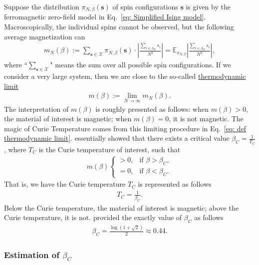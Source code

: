 \documentclass[11pt,letterpaper, leqno]{article}
\numberwithin{equation}{section}
\numberwithin{theorem}{section}
\numberwithin{lemma}{section}
\numberwithin{corollary}{section}
\numberwithin{definition}{section}
\numberwithin{proposition}{section}
\numberwithin{remark}{section}
\numberwithin{example}{section}
\begin{document}
Suppose the distribution $\pi_{N,\beta}(\boldsymbol{s})$ of spin configurations $\boldsymbol{s}$ is given by the ferromagnetic zero-field model in Eq.~\eqref{eq: Simplified Ising model}. Macroscopically, the individual spins cannot be observed, but the following average magnetization can
\begin{align}\label{eq: average magnetization}
    m_N(\beta):=\sum_{\boldsymbol{s}\in \mathcal{X}} \pi_{N,\beta}(\boldsymbol{s}) \cdot \left\vert\frac{\sum_{i\in\Lambda_N}s_i}{N^2}\right\vert=\mathbb{E}_{\pi_{N,\beta}}\left\vert\frac{\sum_{i\in\Lambda_N}s_i}{N^2}\right\vert,
\end{align}
where ``$\sum_{\boldsymbol{s}\in \mathcal{X}}$" means the sum over all possible spin configurations. If we consider a very large system, then we are close to the so-called \href{https://en.wikipedia.org/wiki/Thermodynamic_limit}{thermodynamic limit}
\begin{align}\label{eq: def thermodynamic limit}
    m(\beta):=\lim_{N\rightarrow\infty}m_N(\beta).
\end{align}
The interpretation of $m(\beta)$ is roughly presented as follows: when $m(\beta)>0$, the material of interest is magnetic; when $m(\beta)=0$, it is not magnetic. The magic of Curie Temperature comes from this limiting procedure in Eq.~\eqref{eq: def thermodynamic limit}. \cite{peierls1936ising} essentially showed that there exists a critical value $\beta_C=\frac{1}{T_C}$, where $T_C$ is the Curie temperature of interest, such that 
\begin{align}\label{eq: def of beta C}
    m(\beta)\left\{
    \begin{aligned}
    >0,\ \ \mbox{ if }\beta>\beta_C,\\
    =0,\ \ \mbox{ if }\beta<\beta_C.
    \end{aligned}
    \right.
\end{align}
That is, we have the Curie temperature $T_C$ is represented as follows
\begin{align}\label{eq: representation of Curie temperature}
    T_C=\frac{1}{\beta_C}.
\end{align}
Below the Curie temperature, the material of interest is magnetic; above the Curie temperature, it is not. \cite{onsager1944crystal} provided the exactly value of $\beta_C$ as follows
\begin{align}\label{eq: beta C}
    \boxed{\beta_C=\frac{\log(1+\sqrt{2})}{2} \approx0.44.}
\end{align}


\subsubsection{Estimation of $\beta_C$}
\end{document}
